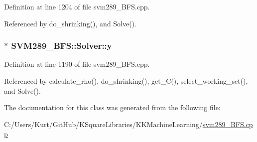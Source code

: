 Definition at line 1204 of file svm289\+\_\+\+B\+F\+S.\+cpp.



Referenced by do\+\_\+shrinking(), and Solve().

\subsubsection[{\texorpdfstring{y}{y}}]{$\ast$ S\+V\+M289\+\_\+\+B\+F\+S\+::\+Solver\+::y\hspace{0.3cm}{\ttfamily [protected]}}\hypertarget{class_s_v_m289___b_f_s_1_1_solver_ab6e1027acd321351163e02445ac37a48}{}\label{class_s_v_m289___b_f_s_1_1_solver_ab6e1027acd321351163e02445ac37a48}


Definition at line 1190 of file svm289\+\_\+\+B\+F\+S.\+cpp.



Referenced by calculate\+\_\+rho(), do\+\_\+shrinking(), get\+\_\+\+C(), select\+\_\+working\+\_\+set(), and Solve().



The documentation for this class was generated from the following file\+:\begin{DoxyCompactItemize}
\item 
C\+:/\+Users/\+Kurt/\+Git\+Hub/\+K\+Square\+Libraries/\+K\+K\+Machine\+Learning/\hyperlink{svm289___b_f_s_8cpp}{svm289\+\_\+\+B\+F\+S.\+cpp}\end{DoxyCompactItemize}
